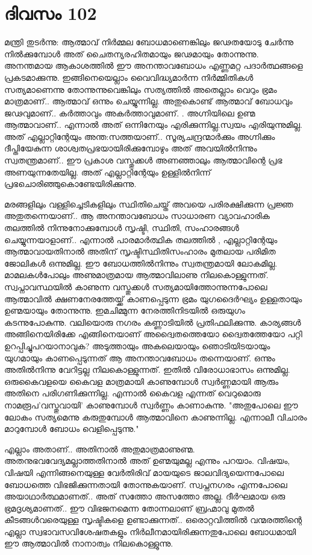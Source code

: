 \newpage
\section{ദിവസം 102}


മന്ത്രി തുടര്‍ന്നു: ആത്മാവ്‌ നിര്‍മ്മല ബോധമാണെങ്കിലും ജഢതയോടു ചേര്‍ന്നു നില്‍ക്കുമ്പോള്‍ അത്‌ ചൈതന്യരഹിതമായും ജഢമായും തോന്നുന്നു. അനന്തമായ ആകാശത്തില്‍ ഈ അനന്താവബോധം എണ്ണമറ്റ പദാര്‍ത്ഥങ്ങളെ പ്രകടമാക്കുന്നു. ഇങ്ങിനെയെല്ലാം വൈവിദ്ധ്യമാര്‍ന്ന നിര്‍മ്മിതികള്‍ സത്യമാണെന്നു തോന്നുന്നുവെങ്കിലും സത്യത്തില്‍ അതെല്ലാം വെറും ഭ്രമം മാത്രമാണ്‌.. ആത്മാവ്‌ ഒന്നും ചെയ്യുന്നില്ല. അതുകൊണ്ട്‌ ആത്മാവ്‌ ബോധവും ജഢവുമാണ്‌..  കര്‍ത്താവും അകര്‍ത്താവുമാണ്‌. .  അഗ്നിയിലെ ഉണ്മ ആത്മാവാണ്‌..  എന്നാല്‍ അത്‌ ഒന്നിനേയും എരിക്കുന്നില്ല.സ്വയം എരിയുന്നുമില്ല. അത്‌ എല്ലാറ്റിന്റേയും അന്ത:സത്തയാണ്‌..  സൂര്യചന്ദ്രന്മാര്‍ക്കും അഗ്നിക്കും ദീപ്തിയേകുന്ന ശാശ്വതപ്രഭയായിരിക്കുമ്പോഴും അത്‌ അവയില്‍നിന്നും സ്വതന്ത്രമാണ്‌..  ഈ പ്രകാശ വസ്തുക്കള്‍ അണഞ്ഞാലും ആത്മാവിന്റെ പ്രഭ അണയുന്നതേയില്ല. അത്‌ എല്ലാറ്റിന്റേയും ഉള്ളില്‍നിന്ന് പ്രഭചൊരിഞ്ഞുകൊണ്ടേയിരിക്കുന്നു.

മരങ്ങളിലും വള്ളിച്ചെടികളിലും സ്ഥിതിചെയ്ത്‌ അവയെ പരിരക്ഷിക്കുന്ന പ്രജ്ഞ അതുതന്നെയാണ്‌..  ആ അനന്താവബോധം സാധാരണ വ്യാവഹാരിക തലത്തില്‍ നിന്നുനോക്കുമ്പോള്‍ സൃഷ്ടി, സ്ഥിതി, സംഹാരങ്ങള്‍ ചെയ്യുന്നയാളാണ്‌..  എന്നാല്‍ പാരമാര്‍ത്ഥിക തലത്തില്‍ , എല്ലാറ്റിന്റേയും ആത്മാവായതിനാല്‍ അതിന്‌ സൃഷ്ടിസ്ഥിതിസംഹാരം മുതലായ പരിമിത ജോലികള്‍ ഒന്നുമില്ല. ഈ ബോധത്തില്‍നിന്നും സ്വതന്ത്രമായി ലോകമില്ല. മാമലകള്‍പോലും അണുമാത്രമായ ആത്മാവിലാണു നിലകൊള്ളുന്നത്‌. സ്വപ്നാവസ്ഥയില്‍ കാണുന്ന വസ്തുക്കള്‍ സത്യമായിത്തോന്നുന്നപോലെ ആത്മാവില്‍ ക്ഷണനേരത്തേയ്ക്ക്‌ കാണപ്പെടുന്ന ഭ്രമം യുഗദൈര്‍ഘ്യം ഉള്ളതായും ഉണ്മയായും തോന്നുന്നു. ഇമചിമ്മുന്ന നേരത്തിനിടയില്‍ ഒരുയുഗം കടന്നുപോകുന്നു. വലിയൊരു നഗരം കണ്ണാടിയില്‍ പ്രതിഫലിക്കുന്നു. കാര്യങ്ങള്‍ അങ്ങിനെയിരിക്കേ എങ്ങിനെയാണ്‌ അദ്വൈതത്തെയോ ദ്വൈതത്തേയോ പറ്റി ഉറപ്പിച്ചുപറയാനാവുക? അടുത്തായും അകലെയായും ഞൊടിയിടയായും യുഗമായും കാണപ്പെടുന്നത്‌ ആ അനന്താവബോധം തന്നെയാണ്‌. ഒന്നും അതില്‍നിന്നു വേറിട്ടല്ല നിലകൊള്ളുന്നത്‌. ഇതില്‍ വിരോധാഭാസം ഒന്നുമില്ല. ഒരുകൈവളയെ കൈവള മാത്രമായി കാണുമ്പോള്‍ സ്വര്‍ണ്ണമായി ആരും അതിനെ  പരിഗണിക്കുന്നില്ല. എന്നാല്‍ കൈവള എന്നത്‌ വെറുമൊരു നാമരൂപ'വസ്തുവായി' കാണുമ്പോള്‍ സ്വര്‍ണ്ണം കാണാകുന്നു. "അതുപോലെ ഈ ലോകം സത്യമെന്നു കരുതുമ്പോള്‍ ആത്മാവിനെ കാണുന്നില്ല. എന്നാലീ വിചാരം മാറുമ്പോള്‍ ബോധം വെളിപ്പെടുന്നു." 

എല്ലാം അതാണ്‌..  അതിനാല്‍ അതുമാത്രമാണുണ്മ. അതനുഭവവേദ്യമല്ലാത്തതിനാല്‍ അത്  ഉണ്മയുമല്ല എന്നും പറയാം. വിഷയം, വിഷയി എന്നിങ്ങനെയുള്ള വേര്‍തിരിവ്‌ മായയുടെ ജാലവിദ്യയെന്നപോലെ ബോധത്തെ വിഭജിക്കുന്നതായി തോന്നുകയാണ്‌. സ്വപ്നനഗരം എന്നപോലെ അയാഥാര്‍ത്ഥമാണത്‌..  അത്‌ സത്തോ അസത്തോ അല്ല. ദീര്‍ഘമായ ഒരു ഭ്രമദൃശ്യമാണത്‌..  ഈ വിഭജനമെന്ന തോന്നലാണ്‌ ബ്രഹ്മാവു മുതല്‍ കീടങ്ങള്‍വരെയുള്ള സൃഷ്ടികളെ ഉണ്ടാക്കുന്നത്‌..  ഒരൊറ്റവിത്തില്‍ വന്മരത്തിന്റെ എല്ലാ സ്വഭാവസവിശേഷതകളും നിര്‍ലീനമായിരിക്കുന്നതുപോലെ ബോധമായി ഈ ആത്മാവില്‍ നാനാത്വം നിലകൊള്ളുന്നു. 

